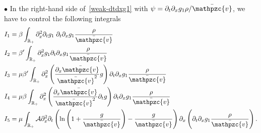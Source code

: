 \documentclass[AHL,Unicode,longabstracts,published]{cedram}
\newcommand{\R}{\mathbb{R}}
\newcommand{\p}{\partial}
\newcommand{\bv}{\bar{\mathpzc{v}}}
\newcommand{\cA}{\mathcal A}
\begin{document}
$\bullet$ In the right-hand side of~\eqref{weak-dtdxg1} with $\psi=\p_t\p_x g_1 \rho/\bv$, we have to control the following integrals
\begin{align*}
I_1 & = \beta \int_{\R_+} \partial_x^2 \partial_t g_1 \; \partial_t \partial_x g_1 \dfrac{\rho}{\bv} \\
I_2 & = \beta' \int_{\R_+} \partial^2_x g_1 \partial_t \partial_x g_1 \dfrac{\rho}{\bv} \\
I_3 & = \mu \beta' \int_{\R_+} \partial^2_x \left(\dfrac{\partial_x \bv}{\bv^2} g\right) \partial_t \partial_x g_1 \dfrac{\rho}{\bv} \\
I_4 & = \mu \beta \int_{\R_+} \partial^2_x \left(\dfrac{\partial_x \bv}{\bv^2} \partial_t g\right) \partial_t \partial_x g_1 \dfrac{\rho}{\bv} \\
I_5 & = \mu \int_{\R_+} \cA \partial^2_x \partial_t \left(\ln \left(1 + \frac{g}{\bv}\right) - \frac{g}{\bv}\right)\p_x\left(\partial_t \partial_x g_1 \dfrac{\rho}{\bv}\right).
\end{align*}
\end{document}
